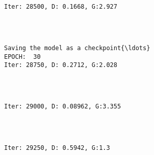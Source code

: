 \documentclass[11pt]{article}
\begin{document}
    \begin{center}
    \end{center}
    { \hspace*{\fill} \\}
    
    \begin{Verbatim}[commandchars=\\\{\}]

Iter: 28500, D: 0.1668, G:2.927
    \end{Verbatim}

    \begin{center}
    \end{center}
    { \hspace*{\fill} \\}
    
    \begin{Verbatim}[commandchars=\\\{\}]

Saving the model as a checkpoint{\ldots}
EPOCH:  30
Iter: 28750, D: 0.2712, G:2.028
    \end{Verbatim}

    \begin{center}
    \end{center}
    { \hspace*{\fill} \\}
    
    \begin{Verbatim}[commandchars=\\\{\}]

Iter: 29000, D: 0.08962, G:3.355
    \end{Verbatim}

    \begin{center}
    \end{center}
    { \hspace*{\fill} \\}
    
    \begin{Verbatim}[commandchars=\\\{\}]

Iter: 29250, D: 0.5942, G:1.3
    \end{Verbatim}
\end{document}
